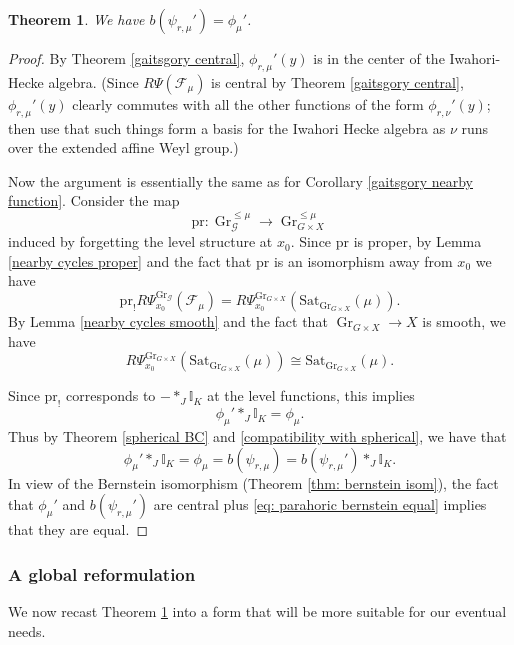 \documentclass[reqno]{amsart}
\numberwithin{equation}{section}
\newcommand{\mbb}[1]{\mathbb{#1}}
\newcommand{\Cal}[1]{\mathcal{#1}}
\newcommand{\co}{\colon}
\newcommand{\mrm}[1]{\mathrm{#1}}
\DeclareMathOperator{\Gr}{Gr}
\newtheorem{thm}{Theorem}[section]
\theoremstyle{remark}
\numberwithin{equation}{section}
\begin{document}
\begin{thm}\label{parahoric BC} We have $b(\psi_{r,\mu}') = \phi_{\mu}'$.
\end{thm}


\begin{proof}
By Theorem \ref{gaitsgory central}, $\phi_{r, \mu}'(y)$ is in the center of the Iwahori-Hecke algebra. (Since $R\Psi(\Cal{F}_{\mu})$ is central by Theorem \ref{gaitsgory central}, $\phi_{r, \mu}'(y)$ clearly commutes with all the other functions of the form  $\phi_{r, \nu}'(y)$; then use that such things form a basis for the Iwahori Hecke algebra as $\nu$ runs over the extended affine Weyl group.)

Now the argument is essentially the same as for Corollary \ref{gaitsgory nearby function}. Consider the map 
\[
\mrm{pr} \co \Gr_{\Cal{G}}^{\leq \mu} \rightarrow  \Gr_{G \times X}^{\leq \mu}
\]
induced by forgetting the level structure at $x_0$. Since $\mrm{pr}$ is proper, by Lemma \ref{nearby cycles proper} and the fact that $\mrm{pr}$ is an isomorphism away from $x_0$ we have
\[
\mrm{pr}_! R\Psi^{\Gr_{\Cal{G}}}_{x_0}(\Cal{F}_{\mu}) = R\Psi^{\Gr_{G \times X}}_{x_0}(\mrm{Sat}_{\Gr_{G \times X}}(\mu)).	
\]
By Lemma \ref{nearby cycles smooth} and the fact that $\Gr_{G \times X} \rightarrow X$ is smooth, we have 
\[
R\Psi^{\Gr_{G \times X}}_{x_0}(\mrm{Sat}_{\Gr_{G \times X}}(\mu))\cong \mrm{Sat}_{\Gr_{G \times X}}(\mu).
\]

Since $\mrm{pr}_!$ corresponds to $- *_J \mbb{I}_K$ at the level functions, this implies
\[
 \phi_{\mu}' *_J \mbb{I}_K = \phi_{\mu}.
\]
Thus by Theorem \ref{spherical BC} and \eqref{compatibility with spherical}, we have that
\begin{equation}\label{eq: parahoric bernstein equal}
 \phi_{\mu}' *_J \mbb{I}_K = \phi_{\mu} = b(\psi_{r,\mu}) = b(\psi_{r,\mu}') *_J \mbb{I}_K.
\end{equation}
In view of the Bernstein isomorphism (Theorem \ref{thm: bernstein isom}), the fact that $ \phi_{\mu}' $ and $b(\psi_{r,\mu}') $ are central plus \eqref{eq: parahoric bernstein equal} implies that they are equal.  
\end{proof}


\subsubsection{A global reformulation}\label{sssec: bc global reformulation} We now recast Theorem \ref{parahoric BC} into a form that will be more suitable for our eventual needs. 
\end{document}

